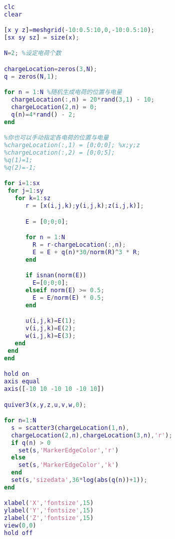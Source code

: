 
\begin{lstlisting}[language=matlab]
%本代码基于CC-BY发布

clc
clear

[x y z]=meshgrid(-10:0.5:10,0,-10:0.5:10);
[sx sy sz] = size(x);

N=2; %设定电荷个数

chargeLocation=zeros(3,N);
q = zeros(N,1);

for n = 1:N %随机生成电荷的位置与电量
  chargeLocation(:,n) = 20*rand(3,1) - 10;
  chargeLocation(2,n) = 0;
  q(n)=4*rand() - 2;
end

%你也可以手动指定各电荷的位置与电量
%chargeLocation(:,1) = [0;0;0]; %x;y;z
%chargeLocation(:,2) = [0;0;5];
%q(1)=1;
%q(2)=-1;

for i=1:sx
 for j=1:sy
   for k=1:sz
      r = [x(i,j,k);y(i,j,k);z(i,j,k)];

      E = [0;0;0];

      for n = 1:N
        R = r-chargeLocation(:,n);
        E = E + q(n)*30/norm(R)^3 * R;
      end

      if isnan(norm(E))
        E=[0;0;0];
      elseif norm(E) >= 0.5;
        E = E/norm(E) * 0.5;
      end

      u(i,j,k)=E(1);
      v(i,j,k)=E(2);
      w(i,j,k)=E(3);
   end
 end
end

hold on
axis equal
axis([-10 10 -10 10 -10 10])

quiver3(x,y,z,u,v,w,0);

for n=1:N
  s = scatter3(chargeLocation(1,n),
  chargeLocation(2,n),chargeLocation(3,n),'r');
  if q(n) > 0
    set(s,'MarkerEdgeColor','r')
  else
    set(s,'MarkerEdgeColor','k')
  end
  set(s,'sizedata',36*log(abs(q(n))+1));
end

xlabel('X','fontsize',15)
ylabel('Y','fontsize',15)
zlabel('Z','fontsize',15)
view(0,0)
hold off
\end{lstlisting}
